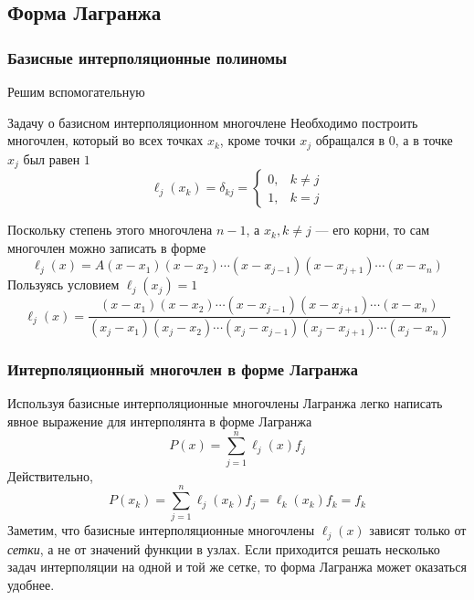 \documentclass[aspectratio=43,unicode]{beamer}
\begin{document}
\subsection{Форма Лагранжа}
\begin{frame}
\frametitle{Базисные интерполяционные полиномы}
	Решим вспомогательную
	\begin{block}{Задачу о базисном интерполяционном многочлене}
		Необходимо построить многочлен, который во всех точках $x_k$, кроме точки $x_j$ обращался в 0,
		а в точке $x_j$ был равен $1$
		\[
		\ell_j(x_k) = \delta_{kj} =
		\begin{cases}
		0,& k\neq j\\
		1,& k = j
		\end{cases}
		\]
	\end{block}
	\pause
	Поскольку степень этого многочлена $n-1$, а $x_k, k\neq j$ --- его корни,
	то сам многочлен можно записать в форме
	$$
	\ell_j(x) = A(x-x_1)(x-x_2)\cdots(x-x_{j-1})(x-x_{j+1})\cdots(x-x_n)
	$$
	\pause
	Пользуясь условием $\ell_j(x_j) = 1$
	$$
	\ell_j(x) = \frac{(x-x_1)(x-x_2)\cdots(x-x_{j-1})(x-x_{j+1})\cdots(x-x_n)}
		{(x_j-x_1)(x_j-x_2)\cdots(x_j-x_{j-1})(x_j-x_{j+1})\cdots(x_j-x_n)}
	$$
\end{frame}

\begin{frame}
\frametitle{Интерполяционный многочлен в форме Лагранжа}
	Используя базисные интерполяционные многочлены Лагранжа легко написать
	явное выражение для интерполянта в форме Лагранжа
	\[
	P(x) = \sum_{j=1}^n \ell_j(x) f_j
	\]
	\pause
	Действительно,
	\[
	P(x_k) = \sum_{j=1}^n \ell_j(x_k) f_j = \ell_k(x_k) f_k = f_k
	\]
	\pause
	Заметим, что базисные интерполяционные многочлены $\ell_j(x)$ зависят только
	от \emph{сетки}, а не от значений функции в узлах. Если приходится решать
	несколько задач интерполяции на одной и той же сетке, то форма Лагранжа может
	оказаться удобнее.
\end{frame}
\end{document}
